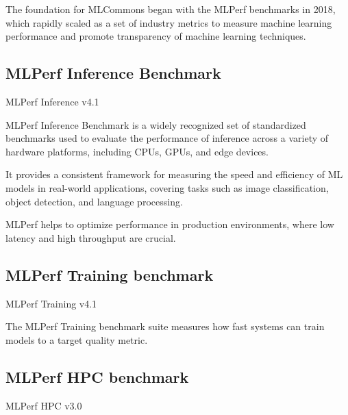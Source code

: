 \documentclass{article}
\begin{document}
The foundation for MLCommons began with the MLPerf benchmarks in 2018, which rapidly scaled as a set of industry metrics to measure machine learning performance and promote transparency of machine learning techniques.

\subsection{MLPerf Inference Benchmark}

MLPerf Inference v4.1  \cite{DBLP:journals/corr/abs-1911-02549}

MLPerf Inference Benchmark is a widely recognized set of standardized benchmarks used to evaluate the performance of inference across a variety of hardware platforms, including CPUs, GPUs, and edge devices. 

It provides a consistent framework for measuring the speed and efficiency of ML models in real-world applications, covering tasks such as image classification, object detection, and language processing. 

MLPerf helps to optimize performance in production environments, where low latency and high throughput are crucial.

\subsection{MLPerf Training benchmark}

MLPerf Training v4.1 \cite{DBLP:journals/corr/abs-1910-01500}

The MLPerf Training benchmark suite measures how fast systems can train models to a target quality metric.

\subsection{MLPerf HPC benchmark}

MLPerf HPC v3.0



\end{document}
